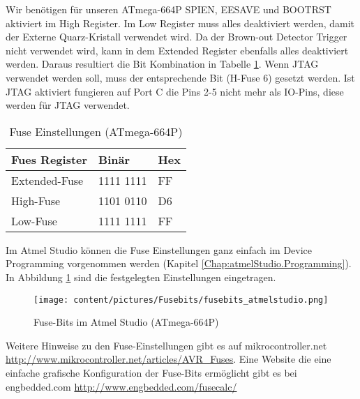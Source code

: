 Wir benötigen für unseren ATmega-664P SPIEN, EESAVE und BOOTRST aktiviert im
High Register. Im Low Register muss alles deaktiviert werden, damit der Externe
Quarz-Kristall verwendet wird. Da der Brown-out Detector Trigger nicht
verwendet wird, kann in dem Extended Register ebenfalls alles deaktiviert
werden. Daraus resultiert die Bit Kombination in Tabelle \ref{fuses-result}.
Wenn \ac{JTAG} verwendet werden soll, muss der entsprechende Bit (H-Fuse 6)
gesetzt werden. Ist \ac{JTAG} aktiviert fungieren auf Port C die Pins 2-5
nicht mehr als IO-Pins, diese werden für \ac{JTAG} verwendet.

\begin{table}[H]
\centering
\begin{tabular}{|l|l|l|} \hline
Fues Register & Binär & Hex\\ \hline
Extended-Fuse & 1111 1111 & FF\\ \hline
High-Fuse & 1101 0110 & D6\\ \hline
Low-Fuse & 1111 1111 & FF\\ \hline
\end{tabular}
\caption{Fuse Einstellungen (ATmega-664P)}
\label{fuses-result}
\end{table}

Im Atmel Studio können die Fuse Einstellungen ganz einfach im Device Programming
vorgenommen werden (Kapitel \ref{Chap:atmelStudio.Programming}). In Abbildung
\ref{fuses-graf} sind die festgelegten Einstellungen eingetragen.

\begin{figure}[H]
\centering
\texttt{[image: content/pictures/Fusebits/fusebits\_atmelstudio.png]}
\caption{Fuse-Bits im Atmel Studio (ATmega-664P)}
\label{fuses-graf}
\end{figure}

Weitere Hinweise zu den Fuse-Einstellungen gibt es auf mikrocontroller.net
\url{http://www.mikrocontroller.net/articles/AVR_Fuses}.
Eine Website die eine einfache grafische Konfiguration der Fuse-Bits ermöglicht
gibt es bei engbedded.com \url{http://www.engbedded.com/fusecalc/}

